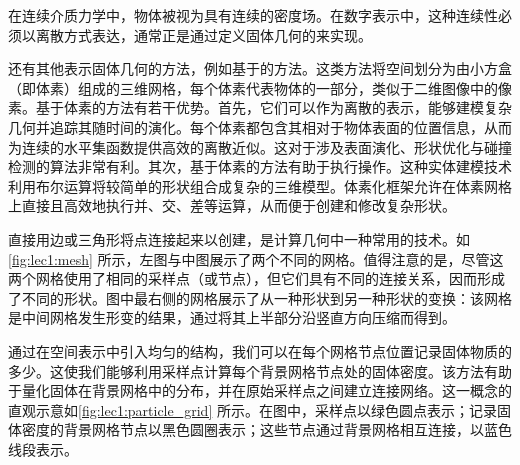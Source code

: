 在连续介质力学中，物体被视为具有连续的密度场。在数字表示中，这种连续性必须以离散方式表达，通常正是通过定义固体几何的来实现。

\begin{remark}[其他固体表示方法]
  \label{rem:lec1:other_solid_rep}
  还有其他表示固体几何的方法，例如基于的方法。这类方法将空间划分为由小方盒（即体素）组成的三维网格，每个体素代表物体的一部分，类似于二维图像中的像素。基于体素的方法有若干优势。首先，它们可以作为离散的表示，能够建模复杂几何并追踪其随时间的演化。每个体素都包含其相对于物体表面的位置信息，从而为连续的水平集函数提供高效的离散近似。这对于涉及表面演化、形状优化与碰撞检测的算法非常有利。其次，基于体素的方法有助于执行操作。这种实体建模技术利用布尔运算将较简单的形状组合成复杂的三维模型。体素化框架允许在体素网格上直接且高效地执行并、交、差等运算，从而便于创建和修改复杂形状。
\end{remark}

\begin{example}[网格]
  \label{exp:lec1:mesh}
  直接用边或三角形将点连接起来以创建，是计算几何中一种常用的技术。如\cref{fig:lec1:mesh} 所示，左图与中图展示了两个不同的网格。值得注意的是，尽管这两个网格使用了相同的采样点（或节点），但它们具有不同的连接关系，因而形成了不同的形状。图中最右侧的网格展示了从一种形状到另一种形状的变换：该网格是中间网格发生形变的结果，通过将其上半部分沿竖直方向压缩而得到。
  \begin{center}
    
    \label{fig:lec1:mesh}
  \end{center}
\end{example}

\begin{example}[粒子与背景网格]
  \label{exp:lec1:particle_grid}
  通过在空间表示中引入均匀的结构，我们可以在每个网格节点位置记录固体物质的多少。这使我们能够利用采样点计算每个背景网格节点处的固体密度。该方法有助于量化固体在背景网格中的分布，并在原始采样点之间建立连接网络。这一概念的直观示意如\cref{fig:lec1:particle_grid} 所示。在图中，采样点以绿色圆点表示；记录固体密度的背景网格节点以黑色圆圈表示；这些节点通过背景网格相互连接，以蓝色线段表示。
  \begin{center}
    
    \label{fig:lec1:particle_grid}
  \end{center}
\end{example}

